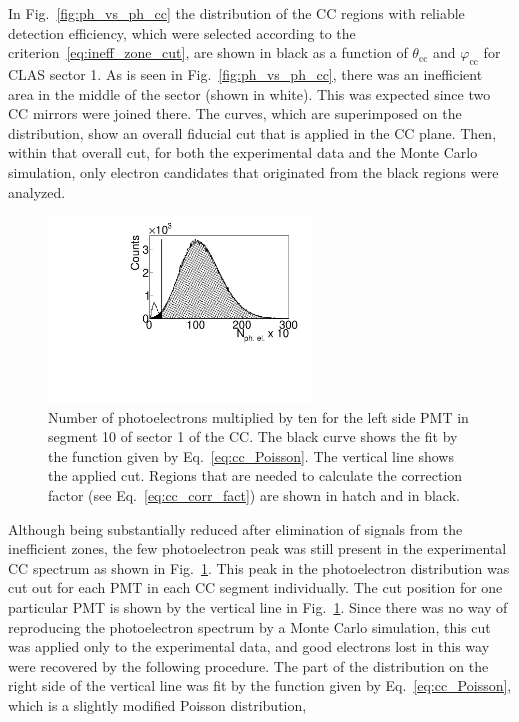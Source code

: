 \documentclass[prc,twocolumn,superscriptaddress,showpacs,amssymb,amsmath,amsfonts,aps,nofootinbib]{revtex4-1}
\begin{document}
In Fig.~\ref{fig:ph_vs_ph_cc} the distribution of the CC regions with reliable detection efficiency, which were selected according to the criterion~\eqref{eq:ineff_zone_cut}, are shown in black as a function of $\theta_{\text{cc}}$ and $\varphi_{\text{cc}}$ for CLAS sector 1. As is seen in Fig.~\ref{fig:ph_vs_ph_cc}, there was an inefficient area in the middle of the sector (shown in white). This was expected since two CC mirrors were joined there. The curves, which are superimposed on the distribution,  show an overall fiducial cut that is applied in the CC plane. Then, within that overall cut, for both the experimental data and the Monte Carlo simulation, only electron candidates that originated from the black regions were analyzed.



\begin{figure}[htp]
\begin{center}
 \includegraphics[width=7cm,keepaspectratio]{pictures/electron_id/ph_el.pdf}
\vspace{-0.1cm}
\caption{Number of photoelectrons multiplied by ten for the left side PMT in segment 10 of sector 1 of the CC. The black curve shows the fit by the function given by Eq.~\eqref{eq:cc_Poisson}. The vertical line shows the applied cut. Regions that are needed to calculate the correction factor (see Eq.~\eqref{eq:cc_corr_fact}) are shown in hatch and in black. }
\label{fig:ph_el}
\end{center}
\end{figure} 
 

 



Although being substantially reduced after elimination of signals from the inefficient zones, the few photoelectron peak was still present in the experimental CC spectrum as shown in Fig.~\ref{fig:ph_el}. This peak in the  photoelectron distribution was cut out for each PMT in each CC segment individually. The cut position for one particular PMT is shown by the vertical line in Fig.~\ref{fig:ph_el}.
Since there was no way  of reproducing the photoelectron spectrum by a Monte Carlo simulation, this cut was applied only to the experimental data, and good electrons lost in this way were recovered by the following procedure. The part of the distribution on the right side of the vertical line was fit by the function given by Eq.~\eqref{eq:cc_Poisson}, which is a slightly modified Poisson distribution, 
\end{document}
